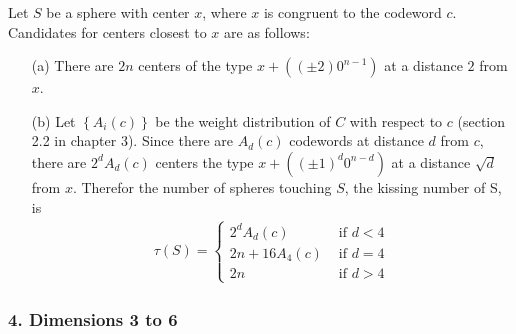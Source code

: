 \documentclass{article}
\renewcommand{\tt}[1]{\text{ #1 }}
\newcommand{\set}[1]{\left\{ #1 \right\}}
\begin{document}
Let $S$ be a sphere with center $x$, where $x$ is congruent to the codeword $c$.
Candidates for centers closest to $x$ are as follows:
\begin{enumerate}
  \item[(a)]
  There are $2n$ centers of the type $x + ((\pm 2) 0^{n-1})$ at a distance $2$ from $x$.

  \item[(b)]
  Let $\set{A_i(c)}$ be the weight distribution of $C$ with respect to $c$ (section 2.2 in chapter 3).
  Since there are $A_d(c)$ codewords at distance $d$ from $c$, there are $2^d A_d(c)$ centers the type $x + ((\pm 1)^d 0^{n-d})$ at a distance $\sqrt d$ from $x$.
  Therefor the number of spheres touching $S$, the kissing number of S, is
  \begin{align*}
    \tau(S) = \begin{cases}
      2^d A_d(c)     &\tt{if} d < 4 \\
      2n + 16 A_4(c) &\tt{if} d = 4 \\
      2n             &\tt{if} d > 4
    \end{cases}
  \end{align*}
\end{enumerate}

\subsubsection{4. Dimensions 3 to 6}
\end{document}
